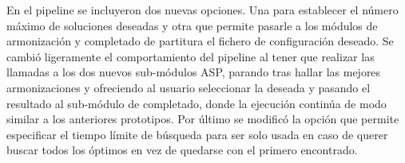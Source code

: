 En el pipeline se incluyeron dos nuevas opciones. Una para establecer el número máximo de soluciones deseadas y otra que permite pasarle a los módulos de armonización y completado de partitura el fichero de configuración deseado. Se cambió ligeramente el comportamiento del pipeline al tener que realizar las llamadas a los dos nuevos sub-módulos ASP, parando tras hallar las mejores armonizaciones y ofreciendo al usuario seleccionar la deseada y pasando el resultado al sub-módulo de completado, donde la ejecución continúa de modo similar a los anteriores prototipos. Por último se modificó la opción que permite especificar el tiempo límite de búsqueda para ser solo usada en caso de querer buscar todos los óptimos en vez de quedarse con el primero encontrado.


